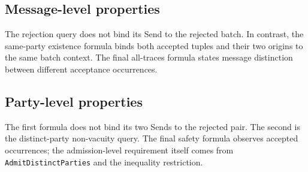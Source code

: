 \noindent\begin{minipage}{\linewidth}
\subsection{Message-level properties}
The rejection query does not bind its Send to the rejected batch. In contrast,
the same-party existence formula binds both accepted tuples and their two
origins to the same batch context. The final all-traces formula states
message distinction between different acceptance occurrences.

\end{minipage}\par\medskip
\noindent\begin{minipage}{\linewidth}

\end{minipage}\par\medskip
\noindent\begin{minipage}{\linewidth}

\end{minipage}\par\medskip

\noindent\begin{minipage}{\linewidth}
\subsection{Party-level properties}
The first formula does not bind its two Sends to the rejected pair. The
second is the distinct-party non-vacuity query. The final safety formula
observes accepted occurrences; the admission-level requirement itself comes
from \texttt{AdmitDistinctParties} and the inequality restriction.

\end{minipage}\par\medskip
\noindent\begin{minipage}{\linewidth}

\end{minipage}\par\medskip
\noindent\begin{minipage}{\linewidth}

\end{minipage}\par\medskip
